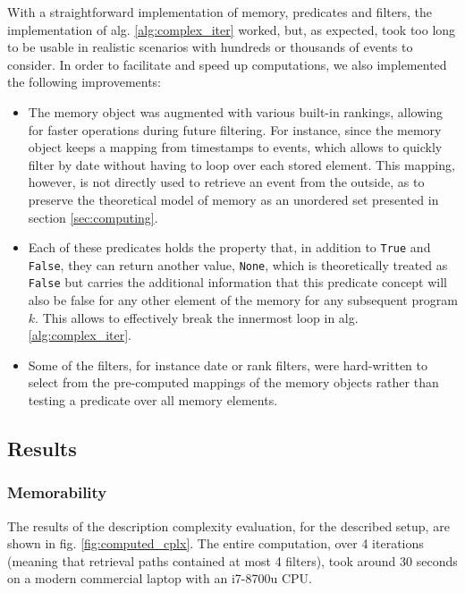 \documentclass[conference]{IEEEtran}
\begin{document}
With a straightforward implementation of memory, predicates and filters, the
implementation of alg. \ref{alg:complex_iter} worked, but, as expected, took too
long to be usable in realistic scenarios with hundreds or thousands of events to
consider. In order to facilitate and speed up computations, we also implemented
the following improvements:
\begin{itemize}
  \item The memory object was augmented with various built-in rankings, allowing
  for faster operations during future filtering. For instance, since the memory
  object keeps a mapping from timestamps to events, which allows to quickly
  filter by date without having to loop over each stored element. This mapping,
  however, is not directly used to retrieve an event from the outside, as to
  preserve the theoretical model of memory as an unordered set presented in
  section \ref{sec:computing}.

  \item Each of these predicates holds the property that, in addition to
  \texttt{True} and \texttt{False}, they can return another value,
  \texttt{None}, which is theoretically treated as \texttt{False} but carries
  the additional information that this predicate concept will also be false for
  any other element of the memory for any subsequent program $k$. This allows to
  effectively break the innermost loop in alg. \ref{alg:complex_iter}.

  \item Some of the filters, for instance date or rank filters, were
  hard-written to select from the pre-computed mappings of the memory objects
  rather than testing a predicate over all memory elements.
\end{itemize}


\subsection{Results}

\subsubsection{Memorability}

The results of the description complexity evaluation, for the described setup,
are shown in fig. \ref{fig:computed_cplx}. The entire computation, over 4
iterations (meaning that retrieval paths contained at most 4 filters), took
around 30 seconds on a modern commercial laptop with an i7-8700u CPU.
\end{document}
